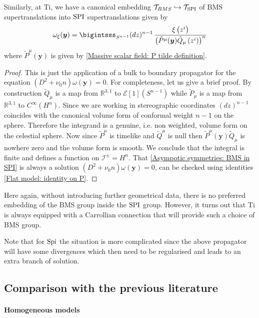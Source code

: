 \documentclass[a4paper, 10pt]{article}
\theoremstyle{remark}
\newcommand{\Spi}{\textnormal{Spi}}
\newcommand{\y}{\bm{y}}
\newcommand{\SPI}{\textnormal{SPI}}%
\begin{document}
Similarly, at Ti, we have a canonical embedding $\mathcal{T}_{BMS}  \hookrightarrow \mathcal{T}_{\SPI}$ of BMS supertranslations into $\SPI$ supertranslations given by \cite{Campiglia:2015lxa,Campiglia:2015kxa}
\begin{equation}\label{Asympotic symmetries: BMS in SPI}
    \omega_\xi(\y) = \bigintsss_{S^{n-1}} (dz)^{n-1} \,\frac{ \xi\left(z^i\right)}{\left( \tilde{P}^{\mu}(\y) \tilde{Q}_{\mu}\left(z^i\right)\right)^{n}}
\end{equation}
where $\tilde{P}^{\mu}(\y)$ is given by \eqref{Massive scalar field: P tilde definition}. 
\begin{proof}
This is just the application of a bulk to boundary propagator for the equation $(D^2 + \nu_0 n) \omega(\y)=0$. For completeness, let us give a brief proof.
    By construction $\tilde{Q}_{\mu}$ is a map from $\mathbb{R}^{3,1}$ to $\mathcal{E}[1](S^{n-1})$ while $\tilde{P}_{\mu}$ is a map from $\mathbb{R}^{3,1}$ to $C^{\infty}(H^n)$. Since we are working in stereographic coordinates $(dz)^{n-1}$ coincides with the canonical volume form of conformal weight $n-1$ on the sphere. Therefore the integrand is a genuine, i.e. non weighted, volume form on the celestial sphere. Now since $\tilde{P}^{\mu}$ is timelike and $\tilde{Q}^{\mu}$ is null then $\tilde{P}^{\mu}(\y) \tilde{Q}_{\mu}$ is nowhere zero and the volume form is smooth. We conclude that the integral is finite and defines a function on $\mathcal{I}^{\pm} = H^n$. That \eqref{Asympotic symmetries: BMS in SPI} is always a solution $(D^2 + \nu_0 n) \omega(\y)=0$, can be checked using identities \eqref{Flat model: identity on P}.
\end{proof}
Here again, without introducing further geometrical data, there is no preferred embedding of the BMS group inside the $\SPI$ group. However, it turns out that Ti is always equipped with a Carrollian connection that will provide such a choice of BMS group.

Note that for $\Spi$ the situation is more complicated since the above propagator will have some divergences which then need to be regularised and leads to an extra branch of solution.


\subsection{Comparison with the previous literature}\label{ssection: Comparison with the previous literature}

\paragraph{Homogeneous models}\mbox{}
\end{document}
